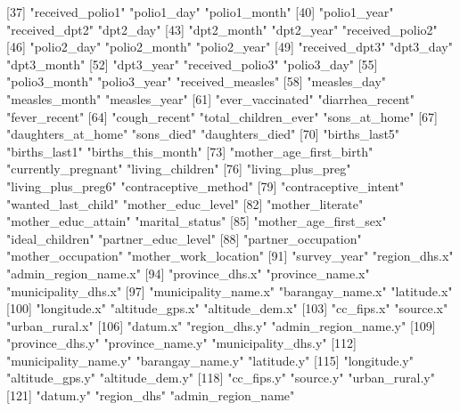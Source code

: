  [37] "received_polio1"           "polio1_day"                "polio1_month"             
 [40] "polio1_year"               "received_dpt2"             "dpt2_day"                 
 [43] "dpt2_month"                "dpt2_year"                 "received_polio2"          
 [46] "polio2_day"                "polio2_month"              "polio2_year"              
 [49] "received_dpt3"             "dpt3_day"                  "dpt3_month"               
 [52] "dpt3_year"                 "received_polio3"           "polio3_day"               
 [55] "polio3_month"              "polio3_year"               "received_measles"         
 [58] "measles_day"               "measles_month"             "measles_year"             
 [61] "ever_vaccinated"           "diarrhea_recent"           "fever_recent"             
 [64] "cough_recent"              "total_children_ever"       "sons_at_home"             
 [67] "daughters_at_home"         "sons_died"                 "daughters_died"           
 [70] "births_last5"              "births_last1"              "births_this_month"        
 [73] "mother_age_first_birth"    "currently_pregnant"        "living_children"          
 [76] "living_plus_preg"          "living_plus_preg6"         "contraceptive_method"     
 [79] "contraceptive_intent"      "wanted_last_child"         "mother_educ_level"        
 [82] "mother_literate"           "mother_educ_attain"        "marital_status"           
 [85] "mother_age_first_sex"      "ideal_children"            "partner_educ_level"       
 [88] "partner_occupation"        "mother_occupation"         "mother_work_location"     
 [91] "survey_year"               "region_dhs.x"              "admin_region_name.x"      
 [94] "province_dhs.x"            "province_name.x"           "municipality_dhs.x"       
 [97] "municipality_name.x"       "barangay_name.x"           "latitude.x"               
[100] "longitude.x"               "altitude_gps.x"            "altitude_dem.x"           
[103] "cc_fips.x"                 "source.x"                  "urban_rural.x"            
[106] "datum.x"                   "region_dhs.y"              "admin_region_name.y"      
[109] "province_dhs.y"            "province_name.y"           "municipality_dhs.y"       
[112] "municipality_name.y"       "barangay_name.y"           "latitude.y"               
[115] "longitude.y"               "altitude_gps.y"            "altitude_dem.y"           
[118] "cc_fips.y"                 "source.y"                  "urban_rural.y"            
[121] "datum.y"                   "region_dhs"                "admin_region_name"        
